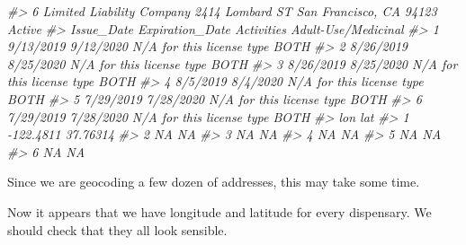 \documentclass[
  12pt,
]{book}
\newenvironment{Shaded}{\begin{snugshade}}{\end{snugshade}}
\newcommand{\CommentTok}[1]{\textcolor[rgb]{0.37,0.37,0.37}{\textit{#1}}}
\newcommand{\ControlFlowTok}[1]{\textcolor[rgb]{0.27,0.27,0.27}{\textbf{#1}}}
\newcommand{\DecValTok}[1]{\textcolor[rgb]{0.06,0.06,0.06}{#1}}
\newcommand{\FunctionTok}[1]{\textcolor[rgb]{0,0,0}{#1}}
\newcommand{\NormalTok}[1]{#1}
\newcommand{\OtherTok}[1]{\textcolor[rgb]{0.37,0.37,0.37}{#1}}
\newcommand{\SpecialCharTok}[1]{\textcolor[rgb]{0,0,0}{#1}}
\begin{document}
\begin{Shaded}
\begin{Highlighting}[]
\CommentTok{\#\textgreater{} 6 Limited Liability Company 2414 Lombard ST San Francisco, CA 94123 Active}
\CommentTok{\#\textgreater{}   Issue\_Date Expiration\_Date                Activities Adult{-}Use/Medicinal}
\CommentTok{\#\textgreater{} 1  9/13/2019       9/12/2020 N/A for this license type                BOTH}
\CommentTok{\#\textgreater{} 2  8/26/2019       8/25/2020 N/A for this license type                BOTH}
\CommentTok{\#\textgreater{} 3  8/26/2019       8/25/2020 N/A for this license type                BOTH}
\CommentTok{\#\textgreater{} 4   8/5/2019        8/4/2020 N/A for this license type                BOTH}
\CommentTok{\#\textgreater{} 5  7/29/2019       7/28/2020 N/A for this license type                BOTH}
\CommentTok{\#\textgreater{} 6  7/29/2019       7/28/2020 N/A for this license type                BOTH}
\CommentTok{\#\textgreater{}         lon      lat}
\CommentTok{\#\textgreater{} 1 {-}122.4811 37.76314}
\CommentTok{\#\textgreater{} 2        NA       NA}
\CommentTok{\#\textgreater{} 3        NA       NA}
\CommentTok{\#\textgreater{} 4        NA       NA}
\CommentTok{\#\textgreater{} 5        NA       NA}
\CommentTok{\#\textgreater{} 6        NA       NA}
\end{Highlighting}
\end{Shaded}

Since we are geocoding a few dozen of addresses, this may take some time.

\begin{Shaded}
\end{Shaded}

Now it appears that we have longitude and latitude for every dispensary. We should check that they all look sensible.

\begin{Shaded}
\end{Shaded}
\end{document}
